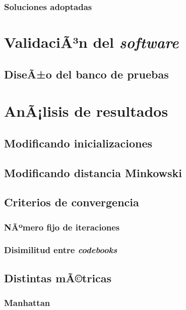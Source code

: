 \documentclass[10pt,a4paper]{article}
\begin{document}
\subsubsection{Soluciones adoptadas} 

\section{ValidaciÃ³n del \textit{software}}

\subsection{DiseÃ±o del banco de pruebas}

\section{AnÃ¡lisis de resultados}

\subsection{Modificando inicializaciones}

\subsection{Modificando distancia Minkowski}

\subsection{Criterios de convergencia}

\subsubsection{NÃºmero fijo de iteraciones}

\subsubsection{Disimilitud entre \textit{codebooks}}

\subsection{Distintas mÃ©tricas}

\subsubsection{Manhattan}
\end{document}
